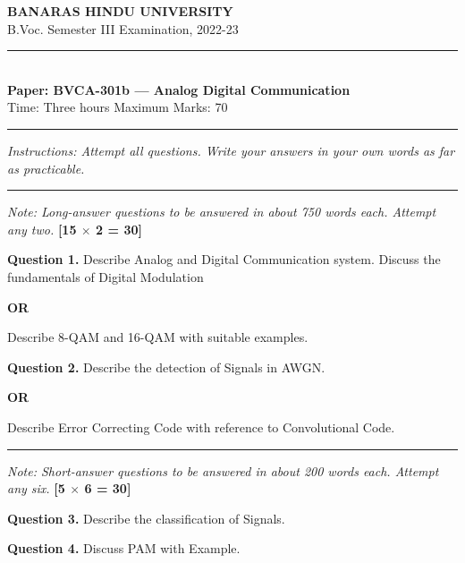 \documentclass[11pt,a4paper]{article}
\begin{document}
\begin{center}
  {\large\bfseries BANARAS HINDU UNIVERSITY}\\[2pt]
  {\normalsize B.Voc. Semester III Examination, 2022-23}\\[6pt]
  \rule{0.8\linewidth}{0.5pt}\\[6pt]
  {\large\bfseries Paper: BVCA-301b --- Analog Digital Communication}\\[4pt]
  {\normalsize Time: Three hours \hfill Maximum Marks: 70}
\end{center}

\rule{\linewidth}{0.4pt}

\smallskip



\noindent   \textit{Instructions: Attempt all questions. Write your answers in your own words as far as practicable.}

\bigskip

\bigskip


\rule{\linewidth}{0.4pt}\smallskip




\noindent   \textit{Note: Long-answer questions to be answered in about 750 words each. Attempt any two.} \hfill   \textbf{[15 $ \times$ 2 = 30]}

\medskip


\noindent   \textbf{Question 1.} Describe Analog and Digital Communication system. Discuss the fundamentals of
Digital Modulation
\centerline{   \textbf{OR}}
Describe 8-QAM and 16-QAM with suitable examples.

\medskip


\noindent   \textbf{Question 2.} Describe the detection of Signals in AWGN.
\centerline{   \textbf{OR}}
Describe Error Correcting Code with reference to Convolutional Code.

\bigskip


\rule{\linewidth}{0.4pt}\smallskip




\noindent   \textit{Note: Short-answer questions to be answered in about 200 words each. Attempt any six.} \hfill   \textbf{[5 $ \times$ 6 = 30]}

\medskip


\noindent   \textbf{Question 3.} Describe the classification of Signals.

\medskip


\noindent   \textbf{Question 4.} Discuss PAM with Example.
\end{document}
